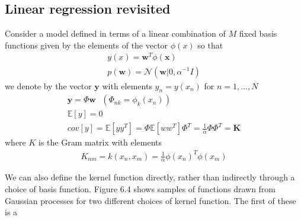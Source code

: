 \documentclass[a4paper]{article}
\begin{document}
\subsection{Linear regression revisited}
Consider a model deﬁned in terms of a linear combination of $M$ ﬁxed
basis functions given by the elements of the vector $\phi(x)$ so that
\begin{align}
y(x) = \mathbf{w}^T\phi(\mathbf{x})\\
p(\mathbf{w}) = \mathcal{N} (\mathbf{w}|0, \alpha^{-1}\mathit{I})
\end{align}
we denote by the vector $\mathbf{y}$ with elements $y_n = y(x_n)$ for $n = 1,...,N$
\begin{align}
\mathbf{y} = \Phi \mathbf{w} \text{ $(\Phi_{nk} = \phi_k(x_n)) $ }\\
\mathbb{E}[y] = 0\\
cov[y] = \mathbb{E}[yy^T] = \Phi \mathbb{E}[ww^T] \Phi^T=
  \frac{1}{\alpha}\Phi\Phi^T = \mathbf{K}
\end{align}
where $K$ is the Gram matrix with elements
\begin{align}
\mathit{K}_{nm} = k(x_n, x_m) = \frac{1}{\alpha} \phi(x_n)^T\phi(x_m)
\end{align}

We can also deﬁne the kernel function directly, rather than indirectly
through a choice of basis function. Figure 6.4 shows samples of functions drawn from Gaussian processes for two different choices of kernel function. The ﬁrst of these is a
\end{document}
